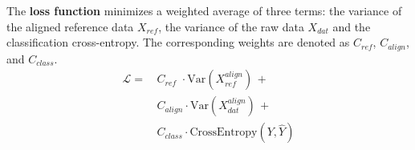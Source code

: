 The \textbf{loss function} minimizes a weighted average of three terms: the variance of the aligned reference data  $X_{ref}$, the variance of the raw data $X_{dat}$ and the classification cross-entropy. The corresponding weights are denoted as $C_{ref}$, $C_{align}$, and $C_{class}$.
\begin{equation}
    \begin{split}
    \mathcal{L} =\,& C_{ref\phantom{g}} \cdot \text{Var}(X_{ref}^{align}) \,+ \\&C_{align} \cdot \text{Var}(X_{dat}^{align}) \,+ \\&C_{class} \cdot \text{CrossEntropy}(Y, \hat{Y})
    \end{split}
\end{equation}


